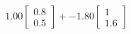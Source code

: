 \documentclass[preview]{standalone}
\begin{document}
\begin{align*}
1.00 \begin{bmatrix} 0.8 \\ 0.5 \end{bmatrix} + -1.80 \begin{bmatrix} 1 \\ 1.6 \end{bmatrix}
\end{align*}
\end{document}
